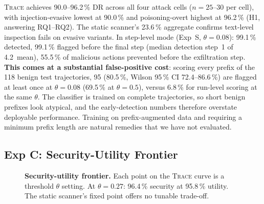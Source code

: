 \documentclass[conference]{IEEEtran}
\begin{document}
\textsc{Trace} achieves 90.0--96.2\,\% DR across all four attack cells
($n{=}25$--$30$ per cell), with injection-evasive lowest at 90.0\,\%
and poisoning-overt highest at 96.2\,\% (H1, answering RQ1--RQ2).
The static scanner's 23.6\,\% aggregate confirms text-level inspection
fails on evasive variants.  In step-level mode (Exp~S, $\theta{=}0.08$):
99.1\,\% detected, 99.1\,\% flagged before the final step (median
detection step~1 of 4.2~mean), 55.5\,\% of malicious actions
prevented before the exfiltration step.  \textbf{This comes at a
substantial false-positive cost}: scoring every prefix of the 118 benign
test trajectories, 95 (80.5\,\%, Wilson 95\,\% CI 72.4--86.6\,\%) are
flagged at least once at $\theta{=}0.08$ (69.5\,\% at $\theta{=}0.5$),
versus 6.8\,\% for run-level scoring at the same $\theta$.  The
classifier is trained on complete trajectories, so short benign
prefixes look atypical, and the early-detection numbers therefore
overstate deployable performance.  Training on prefix-augmented data
and requiring a minimum prefix length are natural remedies that we
have not evaluated.

\subsection{Exp C: Security-Utility Frontier}
\label{sec:exp_c}

\begin{figure}[t]
\centering
{}
\caption{\textbf{Security-utility frontier.}  Each point on the
  \textsc{Trace} curve is a threshold $\theta$ setting.  At
  $\theta=0.27$: 96.4\,\% security at 95.8\,\% utility.  The
  static scanner's fixed point offers no tunable trade-off.}
\label{fig:frontier}
\end{figure}
\end{document}
